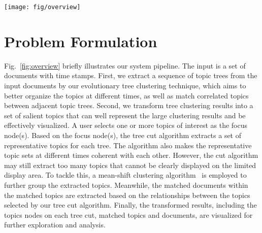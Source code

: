 \begin{figure*}[ht]
  \centering

  \texttt{[image: fig/overview]}
  \caption{System pipeline: (a) generate evolving topic trees (dotted lines represent matched topics between times); (b) generate evolving tree cuts (the star is the user-selected focus node); (c) reorganize the topics according to the Degree-of-Interest (DOI) values; (d) align topic nodes by their depths; (e) color and scale topic nodes by the DOI values; (f) extract matched documents for the matched topics; (g) generate the final visualization.}
  \label{fig:overview}
  \vspace{-3mm}
\end{figure*}

\section{Problem Formulation}
Fig.~\ref{fig:overview} briefly illustrates our system pipeline.
The input is a set of documents with time stamps.
First, we extract a sequence of topic trees from the input documents by our evolutionary tree clustering technique, which aims to better organize the topics at different times, as well as match correlated topics between adjacent topic trees.
Second, we transform tree clustering results into a set of salient topics that can well represent the large clustering results and be effectively visualized.
A user selects one or more topics of interest as the focus node(s).
Based on the focus node(s), the tree cut algorithm extracts a set of representative topics for each tree.
The algorithm also makes the representative topic sets at different times coherent with each other.
However, the cut algorithm may still extract too many topics that cannot be clearly displayed on the limited display area.
To tackle this, a mean-shift clustering algorithm~\cite{comaniciu2002mean} is employed to further group the extracted topics.
Meanwhile, the matched documents within the matched topics are extracted based on the relationships between the topics selected by our tree cut algorithm.
Finally, the transformed results, including the topics nodes on each tree cut, matched topics and documents, are visualized for further exploration and analysis.